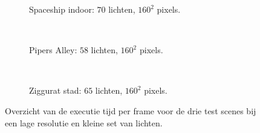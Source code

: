 \begin{figure}[p]
  \begin{subfigure}[b]{\textwidth}
    \centering
    \def\svgwidth{\textwidth}
    
    \caption{Spaceship indoor: $70$ lichten, $160^2$ pixels.}
    \label{fig:fds-test-frames:indoor-low}
  \end{subfigure} \\
  \begin{subfigure}[b]{\textwidth}
    \centering
    \def\svgwidth{\textwidth}
    
    \caption{Pipers Alley: $58$ lichten, $160^2$ pixels.}
    \label{fig:fds-test-frames:alley-low}
  \end{subfigure} \\
  \begin{subfigure}[b]{\textwidth}
    \centering
    \def\svgwidth{\textwidth}
    
    \caption{Ziggurat stad: $65$ lichten, $160^2$ pixels.}
    \label{fig:fds-test-frames:city-low}
  \end{subfigure} 
  \caption{Overzicht van de executie tijd per frame voor de drie test scenes
           bij een lage resolutie en kleine set van lichten.}
  \label{fig:fds-test-frames-low}
\end{figure}
